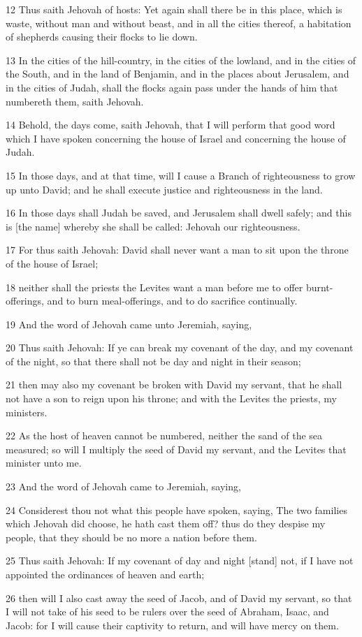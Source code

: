 \par 12 Thus saith Jehovah of hosts: Yet again shall there be in this place, which is waste, without man and without beast, and in all the cities thereof, a habitation of shepherds causing their flocks to lie down.
\par 13 In the cities of the hill-country, in the cities of the lowland, and in the cities of the South, and in the land of Benjamin, and in the places about Jerusalem, and in the cities of Judah, shall the flocks again pass under the hands of him that numbereth them, saith Jehovah.
\par 14 Behold, the days come, saith Jehovah, that I will perform that good word which I have spoken concerning the house of Israel and concerning the house of Judah.
\par 15 In those days, and at that time, will I cause a Branch of righteousness to grow up unto David; and he shall execute justice and righteousness in the land.
\par 16 In those days shall Judah be saved, and Jerusalem shall dwell safely; and this is [the name] whereby she shall be called: Jehovah our righteousness.
\par 17 For thus saith Jehovah: David shall never want a man to sit upon the throne of the house of Israel;
\par 18 neither shall the priests the Levites want a man before me to offer burnt-offerings, and to burn meal-offerings, and to do sacrifice continually.
\par 19 And the word of Jehovah came unto Jeremiah, saying,
\par 20 Thus saith Jehovah: If ye can break my covenant of the day, and my covenant of the night, so that there shall not be day and night in their season;
\par 21 then may also my covenant be broken with David my servant, that he shall not have a son to reign upon his throne; and with the Levites the priests, my ministers.
\par 22 As the host of heaven cannot be numbered, neither the sand of the sea measured; so will I multiply the seed of David my servant, and the Levites that minister unto me.
\par 23 And the word of Jehovah came to Jeremiah, saying,
\par 24 Considerest thou not what this people have spoken, saying, The two families which Jehovah did choose, he hath cast them off? thus do they despise my people, that they should be no more a nation before them.
\par 25 Thus saith Jehovah: If my covenant of day and night [stand] not, if I have not appointed the ordinances of heaven and earth;
\par 26 then will I also cast away the seed of Jacob, and of David my servant, so that I will not take of his seed to be rulers over the seed of Abraham, Isaac, and Jacob: for I will cause their captivity to return, and will have mercy on them.

